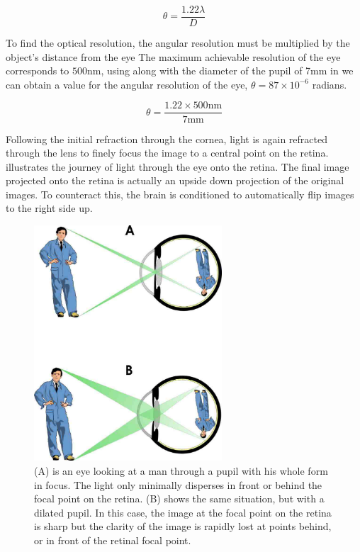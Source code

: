 \begin{equation}
\theta=\frac{1.22\lambda}{D}
\label{eq:res_limit}
\end{equation}

To find the optical resolution, the angular resolution must be multiplied by the
object's distance from the eye The maximum achievable resolution of the eye
corresponds  to $500\textrm{nm}$, using  along with the
diameter of the pupil of 7mm in  we can obtain a value for
the angular resolution of the eye, $\theta=87\times 10^{-6}$ radians.

\begin{equation}
\theta=\frac{1.22\times 500\textrm{nm}}{7\textrm{mm}}
\label{eq:eye_res}
\end{equation}

Following the initial refraction through the cornea, light is again refracted
through the lens to finely focus the image to a central point on the retina.
 illustrates the journey of light through the eye
onto the retina. The final image projected onto the retina is actually an
upside down projection of the original images. To counteract this, the
brain is conditioned to automatically flip images to the right side up.

\begin{figure}[H]
\centering
  \includegraphics[width=7cm]{figures/light_path}
\caption{(A) is an eye looking at a man through a pupil with his whole form in focus.
		The light only minimally disperses in front or behind the focal point
		on the retina. (B) shows the same situation, but with a dilated pupil.
		In this case, the image at the focal point on the retina is sharp but
		the clarity of the image is rapidly lost at points behind, or in front
		of the retinal focal point.\cite{adrian1927action}}
\label{fig:light_journey}
\end{figure}

